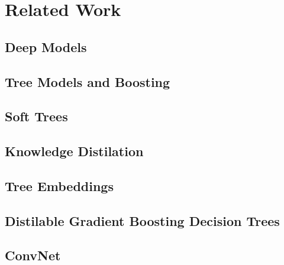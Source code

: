 \chapter{Related Work}

\section{Deep Models}
\section{Tree Models and Boosting}
\section{Soft Trees}
\section{Knowledge Distilation}
\section{Tree Embeddings}
\section{Distilable Gradient Boosting Decision Trees}
\section{ConvNet}